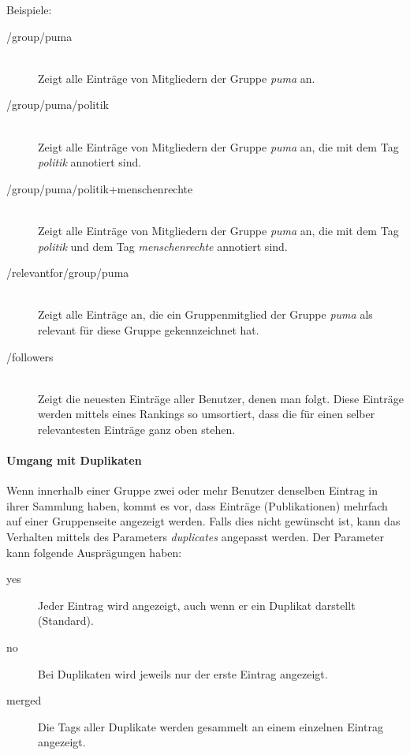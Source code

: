 Beispiele:
\begin{description}
    \item [/group/puma] \hfill \\
    Zeigt alle Einträge von Mitgliedern der Gruppe \textit{puma} an.
    \item [/group/puma/politik] \hfill \\
    Zeigt alle Einträge von Mitgliedern der Gruppe \textit{puma} an, die mit dem Tag \textit{politik} annotiert sind. 
    \item [/group/puma/politik+menschenrechte] \hfill \\
    Zeigt alle Einträge von Mitgliedern der Gruppe \textit{puma} an, die mit dem Tag \textit{politik} und dem Tag \textit{menschenrechte} annotiert sind. 
    \item [/relevantfor/group/puma] \hfill \\
    Zeigt alle Einträge an, die ein Gruppenmitglied der Gruppe \textit{puma} als relevant für diese Gruppe gekennzeichnet hat.
    \item [/followers] \hfill \\
    Zeigt die neuesten Einträge aller Benutzer, denen man folgt. Diese Einträge werden mittels eines Rankings so umsortiert, dass die für einen selber relevantesten Einträge ganz oben stehen. 
\end{description}



\paragraph*{Umgang mit Duplikaten}
\label{subsec:duplikate}
Wenn innerhalb einer Gruppe zwei oder mehr Benutzer denselben Eintrag in ihrer Sammlung haben, kommt es vor, dass Einträge (Publikationen) mehrfach auf einer Gruppenseite angezeigt werden. Falls dies nicht gewünscht ist, kann das Verhalten mittels des Parameters \textit{duplicates} angepasst werden. Der Parameter kann folgende Ausprägungen haben:
\begin{description}
\item [yes] Jeder Eintrag wird angezeigt, auch wenn er ein Duplikat darstellt (Standard).
  \item[no] Bei Duplikaten wird jeweils nur der erste Eintrag angezeigt.
  \item [merged] Die Tags aller Duplikate werden gesammelt an einem einzelnen Eintrag angezeigt.
  \end{description}

